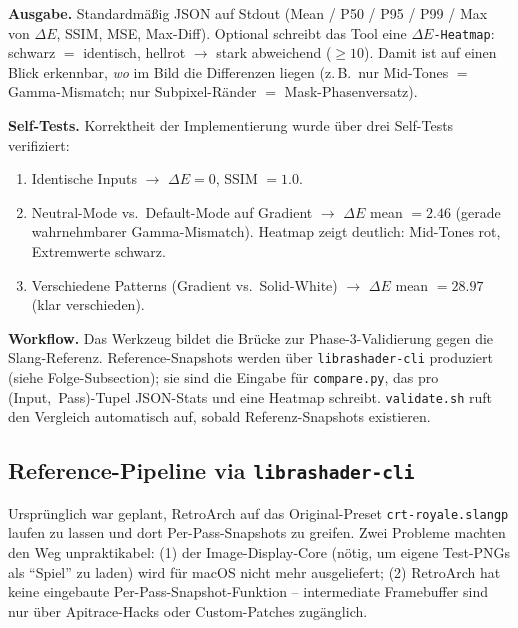 \documentclass[11pt, a4paper]{article}
\begin{document}
\vspace{.25cm}
\textbf{Ausgabe.} Standardm\"a\ss ig JSON auf Stdout (Mean / P50 / P95 / P99 / Max von $\Delta E$, SSIM, MSE, Max-Diff). Optional schreibt das Tool eine \texttt{$\Delta E$-Heatmap}: schwarz $=$ identisch, hellrot $\to$ stark abweichend ($\geq 10$). Damit ist auf einen Blick erkennbar, \emph{wo} im Bild die Differenzen liegen (z.\,B.\ nur Mid-Tones $=$ Gamma-Mismatch; nur Subpixel-R\"ander $=$ Mask-Phasenversatz).

\vspace{.25cm}
\textbf{Self-Tests.} Korrektheit der Implementierung wurde \"uber drei Self-Tests verifiziert:
\begin{enumerate}[leftmargin=*, nosep]
    \item Identische Inputs $\to$ $\Delta E = 0$, SSIM $= 1.0$.
    \item Neutral-Mode vs.\ Default-Mode auf Gradient $\to$ $\Delta E$ mean $= 2.46$ (gerade wahrnehmbarer Gamma-Mismatch). Heatmap zeigt deutlich: Mid-Tones rot, Extremwerte schwarz.
    \item Verschiedene Patterns (Gradient vs.\ Solid-White) $\to$ $\Delta E$ mean $= 28.97$ (klar verschieden).
\end{enumerate}

\vspace{.25cm}
\textbf{Workflow.} Das Werkzeug bildet die Br\"ucke zur Phase-3-Validierung gegen die Slang-Referenz. Reference-Snapshots werden \"uber \texttt{librashader-cli} produziert (siehe Folge-Subsection); sie sind die Eingabe f\"ur \texttt{compare.py}, das pro \mbox{(Input, Pass)}-Tupel JSON-Stats und eine Heatmap schreibt. \texttt{validate.sh} ruft den Vergleich automatisch auf, sobald Referenz-Snapshots existieren.

\vspace{.5cm}
\subsection{Reference-Pipeline via \texttt{librashader-cli}}
\vspace{.5cm}
Urspr\"unglich war geplant, RetroArch auf das Original-Preset \texttt{crt-royale.slangp} laufen zu lassen und dort Per-Pass-Snapshots zu greifen. Zwei Probleme machten den Weg unpraktikabel: (1) der Image-Display-Core (n\"otig, um eigene Test-PNGs als ``Spiel'' zu laden) wird f\"ur macOS nicht mehr ausgeliefert; (2) RetroArch hat keine eingebaute Per-Pass-Snapshot-Funktion -- intermediate Framebuffer sind nur \"uber Apitrace-Hacks oder Custom-Patches zug\"anglich.
\end{document}

